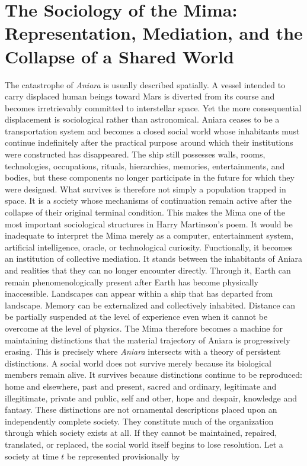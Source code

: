 \documentclass[11pt,oneside]{book}
\theoremstyle{definition}
\theoremstyle{remark}
\begin{document}
\chapter{The Sociology of the Mima: Representation, Mediation, and the Collapse of a Shared World}\label{chap:sociology-mima}

The catastrophe of \emph{Aniara} is usually described spatially. A vessel intended to carry
displaced human beings toward Mars is diverted from its course and becomes irretrievably committed
to interstellar space. Yet the more consequential displacement is sociological rather than
astronomical. Aniara ceases to be a transportation system and becomes a closed social world whose
inhabitants must continue indefinitely after the practical purpose around which their institutions
were constructed has disappeared. The ship still possesses walls, rooms, technologies, occupations,
rituals, hierarchies, memories, entertainments, and bodies, but these components no longer
participate in the future for which they were designed. What survives is therefore not simply a
population trapped in space. It is a society whose mechanisms of continuation remain active after
the collapse of their original terminal condition. This makes the Mima one of the most important
sociological structures in Harry Martinson's poem. It would be inadequate to interpret the Mima
merely as a computer, entertainment system, artificial intelligence, oracle, or technological
curiosity. Functionally, it becomes an institution of collective mediation. It stands between the
inhabitants of Aniara and realities that they can no longer encounter directly. Through it, Earth
can remain phenomenologically present after Earth has become physically inaccessible. Landscapes can
appear within a ship that has departed from landscape. Memory can be externalized and collectively
inhabited. Distance can be partially suspended at the level of experience even when it cannot be
overcome at the level of physics. The Mima therefore becomes a machine for maintaining distinctions
that the material trajectory of Aniara is progressively erasing. This is precisely where
\emph{Aniara} intersects with a theory of persistent distinctions. A social world does not survive
merely because its biological members remain alive. It survives because distinctions continue to be
reproduced: home and elsewhere, past and present, sacred and ordinary, legitimate and illegitimate,
private and public, self and other, hope and despair, knowledge and fantasy. These distinctions are
not ornamental descriptions placed upon an independently complete society. They constitute much of
the organization through which society exists at all. If they cannot be maintained, repaired,
translated, or replaced, the social world itself begins to lose resolution. Let a society at time
\(t\) be represented provisionally by
\end{document}
